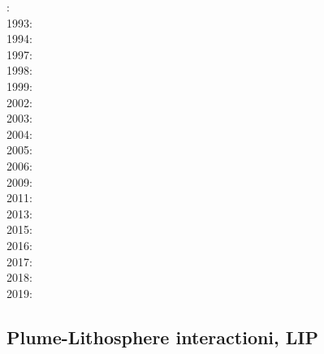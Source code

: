{\scriptsize
{}: \cite{kell91}\\
1993: \cite{keki93}\\
1994: \cite{nasf94}\cite{fari94}\cite{leka94b}\cite{hayu94}\\
1997: \cite{vank97}\cite{keki97}\\
1998: \cite{thta98}\cite{stoc98}\\
1999: \cite{lays99}\\
2002: \cite{falt02}\cite{dagl02}\cite{nitg02}\cite{tagh02}\\
2003: \cite{safa03}\\
2004: \cite{goch04}\cite{scmo04}\\
2005: \cite{tagu05}\\
2006: \cite{isst06}\cite{liva06a}\cite{liva06b}\cite{zhon06}\cite{mita06}\cite{nokm06}\cite{qufo06}
      \cite{keso06}\\
2009: \cite{vavl09}\cite{bogj09}\cite{faho09}\\
2011: \cite{toyu11}\cite{talz11}\cite{burk11}\cite{memm11}\cite{dalt11}\cite{tree11}\\
2013: \cite{dagm13}\cite{madd13}\cite{ande13}\\
2015: \cite{daso15}\cite{hafg15}\\
2016: \cite{kili16}\\
2017: \cite{zhli17}\\
2018: \cite{dacc18}\cite{trev18}\\
2019: \cite{argc19}
}

\subsection{Plume-Lithosphere interactioni, LIP}

